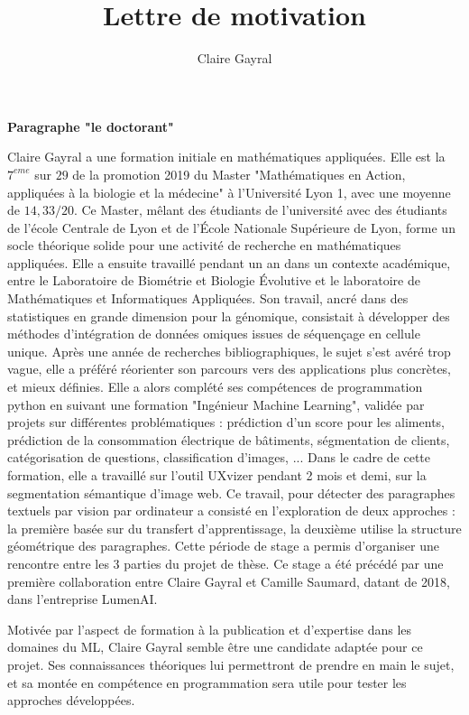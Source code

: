 \documentclass[a4paper,11pt]{article}
\title{Lettre de motivation}
\author{Claire Gayral}
\date{}
\begin{document}
{\centering \Large \bf Paragraphe "le doctorant" \\ \vspace{0.6cm} }


Claire Gayral a une formation initiale en mathématiques appliquées. Elle est la $7^{eme}$ sur $29$ de la promotion 2019 du Master "Mathématiques en Action, appliquées à la biologie et la médecine" à l'Université Lyon 1, avec une moyenne de $14,33/20$. Ce Master, mêlant des étudiants de l'université avec des étudiants de l'école Centrale de Lyon et de l'École Nationale Supérieure de Lyon, forme un socle théorique solide pour une activité de recherche en mathématiques appliquées. Elle a ensuite travaillé pendant un an dans un contexte académique, entre le Laboratoire de Biométrie et Biologie Évolutive et le laboratoire de Mathématiques et Informatiques Appliquées. Son travail, ancré dans des statistiques en grande dimension pour la génomique, consistait à développer des méthodes d'intégration de données omiques issues de séquençage en cellule unique. Après une année de recherches bibliographiques, le sujet s'est avéré trop vague, elle a préféré réorienter son parcours vers des applications plus concrètes, et mieux définies. 
Elle a alors complété ses compétences de programmation python en suivant une formation "Ingénieur Machine Learning", validée par projets sur différentes problématiques : prédiction d’un score pour les aliments, prédiction de la consommation électrique de bâtiments, ségmentation de clients, catégorisation de questions, classification d’images, ... Dans le cadre de cette formation, elle a  travaillé sur l'outil UXvizer pendant 2 mois et demi, sur la segmentation sémantique d’image web. Ce travail, pour détecter des paragraphes textuels par vision par ordinateur a consisté en l'exploration de deux approches : la première basée sur du transfert d’apprentissage, la deuxième utilise la structure géométrique des paragraphes. Cette période de stage a permis d'organiser une rencontre entre les 3 parties du projet de thèse. 
Ce stage a été précédé par une première collaboration entre Claire Gayral et Camille Saumard, datant de 2018, dans l'entreprise LumenAI.  

Motivée par l'aspect de formation à la publication et d'expertise dans les domaines du ML, Claire Gayral semble être une candidate adaptée pour ce projet. Ses connaissances théoriques lui permettront de prendre en main le sujet, et sa montée en compétence en programmation sera utile pour tester les approches développées.\\ %
\end{document}
